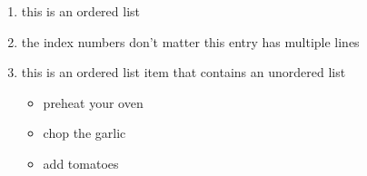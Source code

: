 
\begin{enumerate}

    \item this is an ordered list

    \item the index numbers don't matter
        this entry has multiple lines

    \item this is an ordered list item that contains an unordered list
        \begin{itemize}

            \item preheat your oven

            \item chop the garlic

            \item add tomatoes

    \end{itemize}

\end{enumerate}